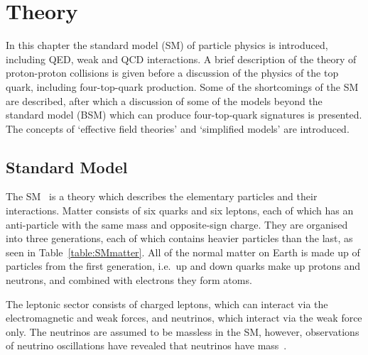 \chapter{Theory}
\label{c:theory}
\vspace{0.6cm}
In this chapter the standard model (SM) of particle physics is introduced, including QED, weak and QCD interactions. A brief description of the theory of proton-proton collisions is given before a discussion of the physics of the top quark, including four-top-quark production. Some of the shortcomings of the SM are described, after which a discussion of some of the models beyond the standard model (BSM) which can produce four-top-quark signatures is presented. The concepts of `effective field theories' and `simplified models' are introduced.

\section{Standard Model}

The SM~\cite{Glashow:1961tr,PhysRevLett.19.1264,Salam:1968rm,DGriff} is a theory which describes the elementary particles and their interactions. Matter consists of six quarks and six leptons, each of which has an anti-particle with the same mass and opposite-sign charge. They are organised into three generations, each of which contains heavier particles than the last, as seen in Table~\ref{table:SMmatter}. All of the normal matter on Earth is made up of particles from the first generation, i.e.~up and down quarks make up protons and neutrons, and combined with electrons they form atoms. 

The leptonic sector consists of charged leptons, which can interact via the electromagnetic and weak forces, and neutrinos, which interact via the weak force only. The neutrinos are assumed to be massless in the SM, however, observations of neutrino oscillations have revealed that neutrinos have mass~\cite{PhysRevC.88.025501}.

